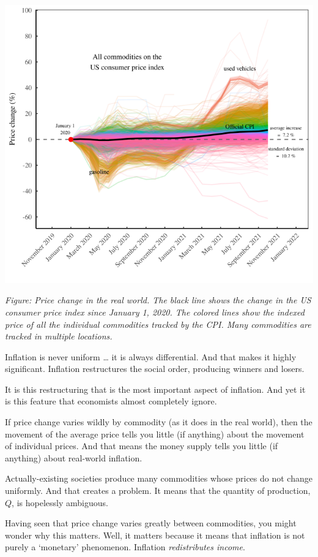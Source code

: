 \documentclass[
]{book}
\begin{document}
\includegraphics{fig/inflation_2020_all.png}

\emph{Figure: Price change in the real world. The black line shows the change in the US consumer price index since January 1, 2020. The colored lines show the indexed price of all the individual commodities tracked by the CPI. Many commodities are tracked in multiple locations.}

Inflation is never uniform \ldots{} it is always differential. And that makes it highly significant. Inflation restructures the social order, producing winners and losers.

It is this restructuring that is the most important aspect of inflation.
And yet it is this feature that economists almost completely ignore.

If price change varies wildly by commodity (as it does in the real world), then the movement of the average price tells you little (if anything) about the movement of individual prices. And that means the money supply tells you little (if anything) about real-world inflation.

Actually-existing societies produce many commodities whose prices do not change uniformly. And that creates a problem. It means that the quantity of production, \(Q\), is hopelessly ambiguous.

Having seen that price change varies greatly between commodities, you might wonder why this matters. Well, it matters because it means that inflation is not purely a `monetary' phenomenon. Inflation \emph{redistributes income}.
\end{document}
